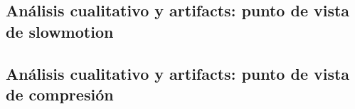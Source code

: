 \newpage
\subsection{Análisis cualitativo y artifacts: punto de vista de slowmotion}

\subsection{Análisis cualitativo y artifacts: punto de vista de compresión}


